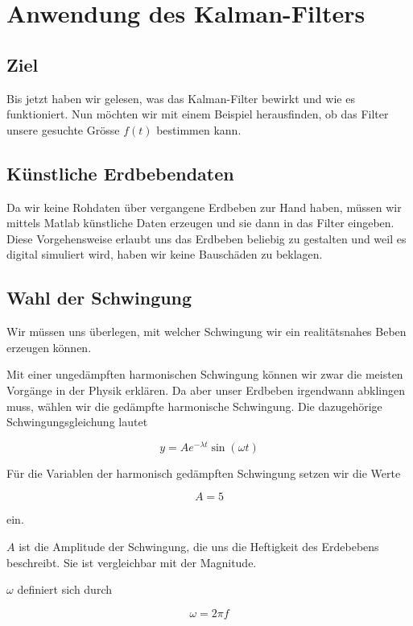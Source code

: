 \section{Anwendung des Kalman-Filters}
\subsection{Ziel}
Bis jetzt haben wir gelesen, was das Kalman-Filter bewirkt und wie es funktioniert.
Nun möchten wir mit einem Beispiel herausfinden, ob das Filter unsere gesuchte Grösse $f(t)$ bestimmen kann.

\subsection{Künstliche Erdbebendaten}
Da wir keine Rohdaten über vergangene Erdbeben zur Hand haben, müssen wir mittels Matlab künstliche Daten  erzeugen und sie dann in das Filter eingeben.
Diese Vorgehensweise erlaubt uns das Erdbeben beliebig zu gestalten
und weil es digital simuliert wird, haben wir keine Bauschäden zu beklagen.

\subsection{Wahl der Schwingung}
Wir müssen uns überlegen, mit welcher Schwingung wir ein realitätsnahes Beben erzeugen können.

Mit einer ungedämpften harmonischen Schwingung können wir zwar die meisten Vorgänge in der Physik erklären.
Da aber unser Erdbeben irgendwann abklingen muss, wählen wir die gedämpfte harmonische Schwingung.
Die dazugehörige Schwingungsgleichung lautet

\begin{equation}
	y = A e^{-\lambda t} \sin(\omega t)
\end{equation}

Für die Variablen der harmonisch gedämpften Schwingung setzen wir die Werte

\begin{equation}
A = 5
\end{equation}

ein.

$A$ ist die Amplitude der Schwingung, die uns die Heftigkeit des Erdebebens beschreibt.
Sie ist vergleichbar mit der Magnitude.

$\omega$ definiert sich durch

\begin{equation}
	\omega = 2 \pi f
\end{equation}

